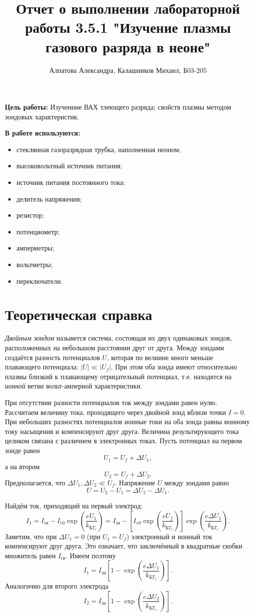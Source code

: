 \documentclass[14pt, a4paper]{report}
\title{\textbf{Отчет о выполнении лабораторной работы 3.5.1 "Изучение плазмы газового разряда в неоне"}}
\author{Алпатова Александра, Калашников Михаил, Б03-205}
\date{}
\begin{document}
\maketitle

\textbf{Цель работы:}
Изученние ВАХ тлеющего разряда; свойств плазмы методом зондовых характеристик.
\newline

\textbf{В работе используются:}
\begin{itemize}
\item стеклянная газоразрядная трубка, наполненная неоном;
\item высоковольтный источник питания;
\item источник питания постоянного тока;
\item делитель напряжения;
\item резистор;
\item потенциометр;
\item амперметры;
\item вольтметры;
\item переключатели. 
\end{itemize}

\section*{Теоретическая справка}

\textit{Двойным зондом} назывется система, состоящая их двух одинаковых зондов, расположенных на небольшом расстоянии друг от друга. Между зондами создаётся разность потенциалов $U$, которая по велиине много меньше плавающего потенциала: $\left|U\right|\ll\left|U_f\right|$. При этом оба зонда имеют относительно плазмы близкий к плавающему отрицательный потенциал, т.е. находятся на \textit{ионной} ветви вольт-амперной характеристики.

При отсутствии разности потенциалов ток между зондами равен нулю. Рассчитаем величину тока, проходящего через двойной зонд вблизи точки $I=0$. При небольших разностях потенциалов ионные токи на оба зонда равны ионному току насыщения и компенсируют друг друга. Величина результирующего тока целиком связана с различием в электронных токах. Пусть потенциал на первом зонде равен\[U_1=U_f+\Delta U_1,\]а на втором\[U_2=U_f+\Delta U_2.\]Предполагается, что $\Delta U_1,\Delta U_2\ll U_f$. Напряжение $U$ между зондами равно\[U=U_2-U_1=\Delta U_2-\Delta U_1.\]

Найдём ток, приходящий на первый электрод:\[I_1=I_{i\text{н}}-I_{e0}\exp{\left(\frac{eU_1}{k_{\text{Б}T_e}}\right)}=I_{i\text{н}}-\left[I_{e0}\exp{\left(\frac{eU_f}{k_{\text{Б}T_e}}\right)}\right]\exp{\left(\frac{e\Delta U_1}{k_{\text{Б}T_e}}\right)}.\]Заметим, что при $\Delta U_1=0$ (при $U_1=U_f$) электронный и ионный ток компенсируют друг друга. Это означает, что заключённый в квадратные скобки множитель равен $I_{i\text{н}}$. Имеем поэтому\[I_1=I_{i\text{н}}\left[1-\exp{\left(\frac{e\Delta U_1}{k_{\text{Б}T_e}}\right)}\right].\]Аналогично для второго электрода\[I_2=I_{i\text{н}}\left[1-\exp{\left(\frac{e\Delta U_2}{k_{\text{Б}T_e}}\right)}\right].\]
\end{document}
